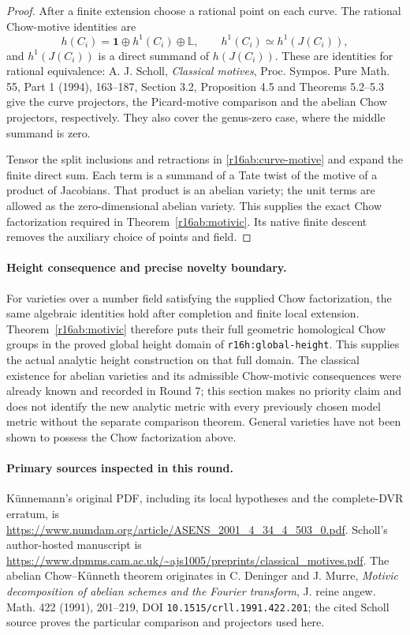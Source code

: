 \begin{proof}
After a finite extension choose a rational point on each curve.
The rational Chow-motive identities are
\[
 h(C_i)=\mathbf 1\oplus h^1(C_i)\oplus\mathbb L,
       \qquad h^1(C_i)\simeq h^1(J(C_i)),
 \tag{AB16.8}\label{r16ab:curve-motive}
\]
and $h^1(J(C_i))$ is a direct summand of $h(J(C_i))$.
These are identities for rational equivalence: A. J. Scholl,
\emph{Classical motives}, Proc. Sympos. Pure Math. 55, Part 1
(1994), 163--187, Section 3.2, Proposition 4.5 and
Theorems 5.2--5.3 give the curve projectors, the Picard-motive
comparison and the abelian Chow projectors, respectively.
They also cover the genus-zero case, where the middle summand is zero.

Tensor the split inclusions and retractions in
\eqref{r16ab:curve-motive} and expand the finite direct sum.
Each term is a summand of a Tate twist of the motive of a product
of Jacobians.  That product is an abelian variety; the unit terms
are allowed as the zero-dimensional abelian variety.  This supplies
the exact Chow factorization required in
Theorem~\ref{r16ab:motivic}.  Its native finite descent removes the
auxiliary choice of points and field.
\end{proof}

\paragraph{Height consequence and precise novelty boundary.}
For varieties over a number field satisfying the supplied Chow
factorization, the same algebraic identities hold after completion
and finite local extension.  Theorem~\ref{r16ab:motivic} therefore
puts their full geometric homological Chow groups in the proved
global height domain of \texttt{r16h:global-height}.  This supplies
the actual analytic height construction on that full domain.
The classical existence for abelian varieties and its admissible
Chow-motivic consequences were already known and recorded in Round 7;
this section makes no priority claim and does not identify the new
analytic metric with every previously chosen model metric without
the separate comparison theorem.  General varieties have not been
shown to possess the Chow factorization above.

\paragraph{Primary sources inspected in this round.}
K\"unnemann's original PDF, including its local hypotheses and the
complete-DVR erratum, is
\url{https://www.numdam.org/article/ASENS_2001_4_34_4_503_0.pdf}.
Scholl's author-hosted manuscript is
\url{https://www.dpmms.cam.ac.uk/~ajs1005/preprints/classical_motives.pdf}.
The abelian Chow--K\"unneth theorem originates in C. Deninger and
J. Murre, \emph{Motivic decomposition of abelian schemes and the
Fourier transform}, J. reine angew. Math. 422 (1991), 201--219,
DOI \texttt{10.1515/crll.1991.422.201}; the cited Scholl source
proves the particular comparison and projectors used here.
